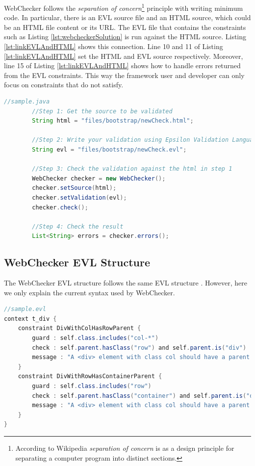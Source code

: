\documentclass[conference]{IEEETran}
\begin{document}
WebChecker follows the \textit{separation of concern}\footnote{According to Wikipedia \textit{separation of concern} is as a design principle for separating a computer program into distinct sections.} principle with writing minimum code. In particular, there is an EVL source file and an HTML source, which could be an HTML file content or its URL. The EVL file that contains the constraints such as Listing \ref{lst:webcheckerSolution} is run against the HTML source. Listing \ref{lst:linkEVLAndHTML} shows this connection. Line 10 and 11 of Listing \ref{lst:linkEVLAndHTML} set the HTML and EVL source respectively. Moreover, line 15 of Listing \ref{lst:linkEVLAndHTML} shows how to handle errors returned from the EVL constraints. This way the framework user and developer can only focus on constraints that do not satisfy.   

\begin{lstlisting}[language=Java, caption=Checking an EVL file against an HTML source file, label={lst:linkEVLAndHTML}]
 	//sample.java    
		//Step 1: Get the source to be validated
		String html = "files/bootstrap/newCheck.html";
		
		//Step 2: Write your validation using Epsilon Validation Language
		String evl = "files/bootstrap/newCheck.evl";
		
		//Step 3: Check the validation against the html in step 1
		WebChecker checker = new WebChecker();
		checker.setSource(html);
		checker.setValidation(evl);
		checker.check();
		
		//Step 4: Check the result
		List<String> errors = checker.errors();


\end{lstlisting}

\subsection{WebChecker EVL Structure}
The WebChecker EVL structure follows the same EVL structure \cite{Kolovos2009}. However, here we only explain the current syntax used by WebChecker. 


\begin{lstlisting}[language=Java, caption=Enforcing Bootstrap Grid Rule by Using WebChecker, label={lst:webcheckerSolution}]
//sample.evl
context t_div { 
    constraint DivWithColHasRowParent {
        guard : self.class.includes("col-*")
        check : self.parent.hasClass("row") and self.parent.is("div")
        message : "A <div> element with class col should have a parent <div> element with class row."
    }
    constraint DivWithRowHasContainerParent {
        guard : self.class.includes("row")
        check : self.parent.hasClass("container") and self.parent.is("div")
        message : "A <div> element with class col should have a parent <div> element with class row."
    }
}

\end{lstlisting}
\end{document}
